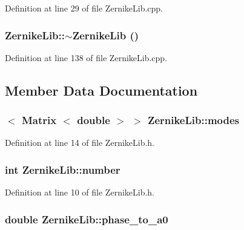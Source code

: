 Definition at line 29 of file ZernikeLib.cpp.

\hypertarget{classZernikeLib_a9e8decc57d7779a36b8c17951a9ef76c}{
\subsubsection[{$\sim$ZernikeLib}]{\setlength{\rightskip}{0pt plus 5cm}ZernikeLib::$\sim$ZernikeLib ()}}
\label{classZernikeLib_a9e8decc57d7779a36b8c17951a9ef76c}


Definition at line 138 of file ZernikeLib.cpp.



\subsection{Member Data Documentation}
\hypertarget{classZernikeLib_ab42df70f2119b588e6b8b0594c48d4b3}{
\subsubsection[{modes}]{$<$ {\bf Matrix} $<$ double $>$ $>$ {\bf ZernikeLib::modes}}}
\label{classZernikeLib_ab42df70f2119b588e6b8b0594c48d4b3}


Definition at line 14 of file ZernikeLib.h.

\hypertarget{classZernikeLib_a05ecfd0dd15af2caaedc23890a36866b}{
\subsubsection[{number}]{\setlength{\rightskip}{0pt plus 5cm}int {\bf ZernikeLib::number}}}
\label{classZernikeLib_a05ecfd0dd15af2caaedc23890a36866b}


Definition at line 10 of file ZernikeLib.h.

\hypertarget{classZernikeLib_ad7f24ebdbe6f873e4c0fa01b5a51e578}{
\subsubsection[{phase\_\-to\_\-a0}]{\setlength{\rightskip}{0pt plus 5cm}double {\bf ZernikeLib::phase\_\-to\_\-a0}}}
\label{classZernikeLib_ad7f24ebdbe6f873e4c0fa01b5a51e578}


